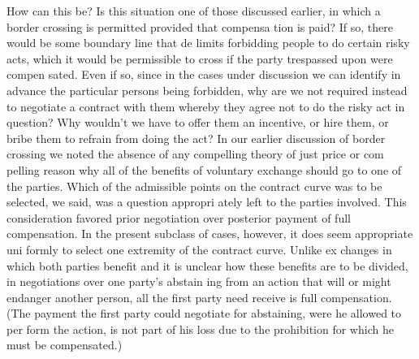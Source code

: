 \documentclass[11pt,openany]{book}
\begin{document}
How can this be? Is this situation one of those discussed earlier, in which a border crossing is permitted provided that compensa tion is paid? If so, there would be some boundary line that de limits forbidding people to do certain risky acts, which it would be permissible to cross if the party trespassed upon were compen sated. Even if so, since in the cases under discussion we can identify in advance the particular persons being forbidden, why are we not required instead to negotiate a contract with them whereby they agree not to do the risky act in question? Why wouldn't we have to offer them an incentive, or hire them, or bribe them to refrain from doing the act? In our earlier discussion of border crossing we noted the absence of any compelling theory of just price or com pelling reason why all of the benefits of voluntary exchange should go to one of the parties. Which of the admissible points on the contract curve was to be selected, we said, was a question appropri ately left to the parties involved. This consideration favored prior negotiation over posterior payment of full compensation. In the present subclass of cases, however, it does seem appropriate uni formly to select one extremity of the contract curve. Unlike ex changes in which both parties benefit and it is unclear how these benefits are to be divided, in negotiations over one party's abstain ing from an action that will or might endanger another person, all the first party need receive is full compensation. (The payment the first party could negotiate for abstaining, were he allowed to per form the action, is not part of his loss due to the prohibition for which he must be compensated.) 
\end{document}
